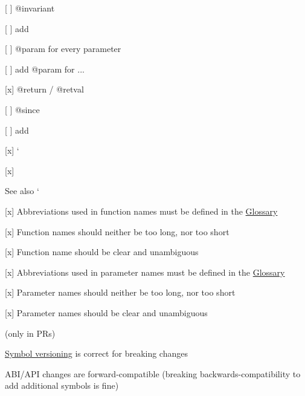 \begin{DoxyItemize}
\begin{DoxyItemize}
\end{DoxyItemize}
\item \mbox{[} \mbox{]} {\ttfamily @invariant}
\begin{DoxyItemize}
\item \mbox{[} \mbox{]} add
\end{DoxyItemize}
\item \mbox{[} \mbox{]} {\ttfamily @param} for every parameter
\begin{DoxyItemize}
\item \mbox{[} \mbox{]} add {\ttfamily @param} for {\ttfamily ...}
\end{DoxyItemize}
\item \mbox{[}x\mbox{]} {\ttfamily @return} / {\ttfamily @retval}
\item \mbox{[} \mbox{]} {\ttfamily @since}
\begin{DoxyItemize}
\item \mbox{[} \mbox{]} add
\end{DoxyItemize}
\item \mbox{[}x\mbox{]} `{\ttfamily }
\item {\ttfamily \mbox{[}x\mbox{]}}\begin{DoxySeeAlso}{See also}
`
\end{DoxySeeAlso}

\end{DoxyItemize}


\begin{DoxyItemize}
\item \mbox{[}x\mbox{]} Abbreviations used in function names must be defined in the \hyperlink{doc_help_elektra-glossary_md}{Glossary}
\item \mbox{[}x\mbox{]} Function names should neither be too long, nor too short
\item \mbox{[}x\mbox{]} Function name should be clear and unambiguous
\item \mbox{[}x\mbox{]} Abbreviations used in parameter names must be defined in the \hyperlink{doc_help_elektra-glossary_md}{Glossary}
\item \mbox{[}x\mbox{]} Parameter names should neither be too long, nor too short
\item \mbox{[}x\mbox{]} Parameter names should be clear and unambiguous
\end{DoxyItemize}

(only in P\+Rs)


\begin{DoxyItemize}
\item \hyperlink{doc_dev_symbol-versioning_md}{Symbol versioning} is correct for breaking changes
\item A\+B\+I/\+A\+PI changes are forward-\/compatible (breaking backwards-\/compatibility to add additional symbols is fine)
\end{DoxyItemize}


